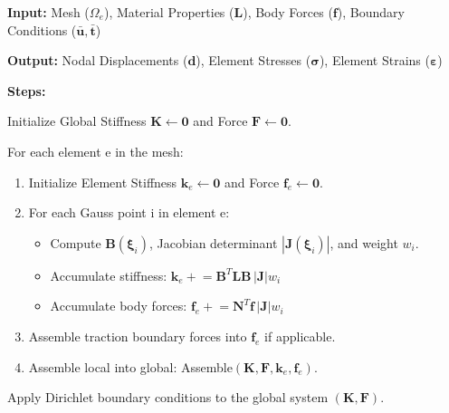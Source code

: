 \documentclass[
  11pt,
  a4paper,
]{scrbook}
\begin{document}
\begin{tcolorbox}[enhanced jigsaw, opacitybacktitle=0.6, leftrule=.75mm, colframe=quarto-callout-note-color-frame, toptitle=1mm, breakable, bottomtitle=1mm, opacityback=0, colback=white, rightrule=.15mm, colbacktitle=quarto-callout-note-color!10!white, arc=.35mm, left=2mm, toprule=.15mm, bottomrule=.15mm, titlerule=0mm, coltitle=black, title={Algorithm: Finite Element Procedure for 3D Elasticity}]

\textbf{Input:} Mesh (\({\Omega_e}\)), Material Properties
(\(\mathbf{L}\)), Body Forces (\(\mathbf{f}\)), Boundary Conditions
(\(\bar{\mathbf{u}}, \bar{\mathbf{t}}\))

\textbf{Output:} Nodal Displacements (\(\mathbf{d}\)), Element Stresses
(\(\boldsymbol{\sigma}\)), Element Strains
(\(\boldsymbol{\varepsilon}\))

\textbf{Steps:}

Initialize Global Stiffness \(\mathbf{K} \leftarrow \mathbf{0}\) and
Force \(\mathbf{F} \leftarrow \mathbf{0}\).

For each element e in the mesh:

\begin{enumerate}
\def\labelenumi{\alph{enumi}.}
\item
  Initialize Element Stiffness \(\mathbf{k}_e \leftarrow \mathbf{0}\)
  and Force \(\mathbf{f}_e \leftarrow \mathbf{0}\).
\item
  For each Gauss point i in element e:

  \begin{itemize}
  \item
    Compute \(\mathbf{B}(\boldsymbol{\xi}_i)\), Jacobian determinant
    \(|\mathbf{J}(\boldsymbol{\xi}_i)|\), and weight \(w_i\).
  \item
    Accumulate stiffness:
    \(\mathbf{k}_e \mathrel{+}= \mathbf{B}^T \mathbf{L} \mathbf{B} \, |\mathbf{J}| w_i\)
  \item
    Accumulate body forces:
    \(\mathbf{f}_e \mathrel{+}= \mathbf{N}^T \mathbf{f} \, |\mathbf{J}| w_i\)
  \end{itemize}
\item
  Assemble traction boundary forces into \(\mathbf{f}_e\) if applicable.
\item
  Assemble local into global:
  Assemble\((\mathbf{K}, \mathbf{F}, \mathbf{k}_e, \mathbf{f}_e)\).
\end{enumerate}

Apply Dirichlet boundary conditions to the global system
\((\mathbf{K}, \mathbf{F})\).


\end{tcolorbox}
\end{document}
